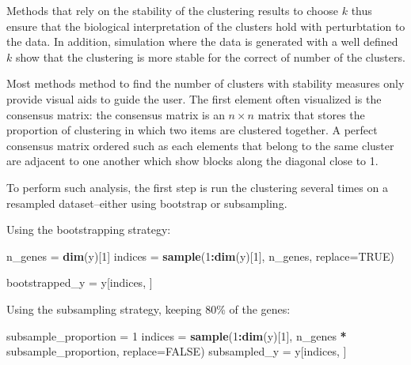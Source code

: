 \documentclass[9pt,a4paper,]{extarticle}
\newenvironment{Shaded}{\begin{snugshade}}{\end{snugshade}}
\newcommand{\DataTypeTok}[1]{\textcolor[rgb]{0.13,0.29,0.53}{#1}}
\newcommand{\DecValTok}[1]{\textcolor[rgb]{0.00,0.00,0.81}{#1}}
\newcommand{\KeywordTok}[1]{\textcolor[rgb]{0.13,0.29,0.53}{\textbf{#1}}}
\newcommand{\NormalTok}[1]{#1}
\newcommand{\OperatorTok}[1]{\textcolor[rgb]{0.81,0.36,0.00}{\textbf{#1}}}
\newcommand{\OtherTok}[1]{\textcolor[rgb]{0.56,0.35,0.01}{#1}}
\newcommand{\StringTok}[1]{\textcolor[rgb]{0.31,0.60,0.02}{#1}}
\begin{document}
Methods that rely on the stability of the clustering results to choose \(k\)
thus ensure that the biological interpretation of the clusters hold with
perturbtation to the data. In addition, simulation where the data is generated
with a well defined \(k\) show that the clustering is more stable for the
correct of number of the clusters.

Most methods method to find the number of clusters with stability measures
only provide visual aids to guide the user. The first element often visualized
is the consensus matrix: the consensus matrix is an \(n \times n\) matrix that
stores the proportion of clustering in which two items are clustered together.
A perfect consensus matrix ordered such as each elements that belong to the
same cluster are adjacent to one another which show blocks along the diagonal
close to 1.

To perform such analysis, the first step is run the clustering several times
on a resampled dataset--either using bootstrap or subsampling.

Using the bootstrapping strategy:

\begin{Shaded}
\begin{Highlighting}[]
\NormalTok{n_genes =}\StringTok{ }\KeywordTok{dim}\NormalTok{(y)[}\DecValTok{1}\NormalTok{]}
\NormalTok{indices =}\StringTok{ }\KeywordTok{sample}\NormalTok{(}\DecValTok{1}\OperatorTok{:}\KeywordTok{dim}\NormalTok{(y)[}\DecValTok{1}\NormalTok{], n_genes, }\DataTypeTok{replace=}\OtherTok{TRUE}\NormalTok{)}

\NormalTok{bootstrapped_y =}\StringTok{ }\NormalTok{y[indices, ]}
\end{Highlighting}
\end{Shaded}

Using the subsampling strategy, keeping 80\% of the genes:

\begin{Shaded}
\begin{Highlighting}[]
\NormalTok{subsample_proportion =}\StringTok{ }\DecValTok{1}
\NormalTok{indices =}\StringTok{ }\KeywordTok{sample}\NormalTok{(}\DecValTok{1}\OperatorTok{:}\KeywordTok{dim}\NormalTok{(y)[}\DecValTok{1}\NormalTok{], n_genes }\OperatorTok{*}\StringTok{ }\NormalTok{subsample_proportion, }\DataTypeTok{replace=}\OtherTok{FALSE}\NormalTok{)}
\NormalTok{subsampled_y =}\StringTok{ }\NormalTok{y[indices, ]}
\end{Highlighting}
\end{Shaded}
\end{document}
